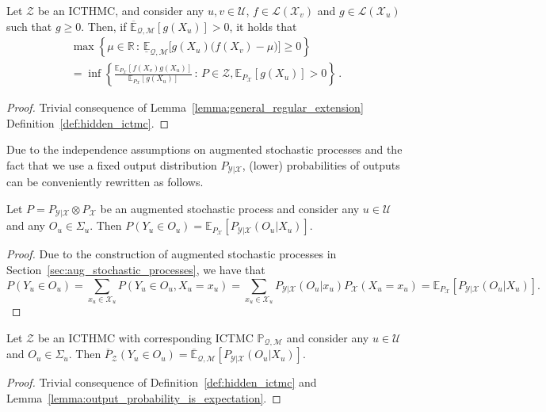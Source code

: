 \documentclass[twoside,11pt]{article}
\newcommand{\reals}{\mathbb{R}}
\newcommand{\states}{\mathcal{X}}
\newcommand{\observs}{\mathcal{Y}}
\newcommand{\lexp}{\underline{\mathbb{E}}_{\rateset,\mathcal{M}}}
\newcommand{\uexp}{\overline{\mathbb{E}}_{\rateset,\mathcal{M}}}
\newcommand{\gambles}{\mathcal{L}}
\newcommand{\rateset}{\mathcal{Q}}
\begin{document}
\begin{corollary}\label{cor:lower_hidden_is_root_chain}
Let $\mathcal{Z}$ be an ICTHMC, and consider any $u,v\in\mathcal{U}$, $f\in\gambles(\states_v)$ and $g\in\gambles(\states_u)$ such that $g\geq 0$. Then, if $\uexp[g(X_u)]>0$, it holds that
\begin{multline*}
\max\left\{\mu\in\reals\,:\, \lexp\bigl[g(X_u)\bigl(f(X_v) - \mu\bigr)\bigr] \geq 0\right\}\\ = \inf\left\{ \frac{\mathbb{E}_{P_\states}[f(X_v)g(X_u)]}{\mathbb{E}_{P_\states}[g(X_u)]}\,:\,P\in\mathcal{Z}, \mathbb{E}_{P_\states}[g(X_u)]>0 \right\}\,.
\end{multline*}
\end{corollary}
\begin{proof}
Trivial consequence of Lemma~\ref{lemma:general_regular_extension} %
Definition~\ref{def:hidden_ictmc}.
\end{proof}

Due to the independence assumptions on augmented stochastic processes and the fact that we use a fixed output distribution $P_{\observs\vert\states}$, (lower) probabilities of outputs can be conveniently rewritten as follows.
\begin{lemma}\label{lemma:output_probability_is_expectation}
Let $P=P_{\observs\vert\states}\otimes P_\states$ be an augmented stochastic process and consider any $u\in\mathcal{U}$ and any $O_u\in\Sigma_u$. Then $P(Y_u\in O_u)=\mathbb{E}_{P_\states}[P_{\observs\vert\states}(O_u\vert X_u)]$.
\end{lemma}
\begin{proof}
Due to the construction of augmented stochastic processes in Section~\ref{sec:aug_stochastic_processes}, we have that
\begin{equation*}
P(Y_u\in O_u) = \sum_{x_u\in\states_u} P(Y_u\in O_u, X_u=x_u) 
 = \sum_{x_u\in\states_u} P_{\observs\vert\states}(O_u\vert x_u)P_\states(X_u=x_u) 
 = \mathbb{E}_{P_\states}[P_{\observs\vert\states}(O_u\vert X_u)].
\end{equation*}
\end{proof}
\begin{lemma}\label{lemma:lower_output_probability_is_expectation}
Let $\mathcal{Z}$ be an ICTHMC with corresponding ICTMC $\mathbb{P}_{\rateset,\mathcal{M}}$ and consider any $u\in\mathcal{U}$ and $O_u\in\Sigma_u$. Then $\overline{P}_{\mathcal{Z}}(Y_u\in O_u)=\uexp[P_{\observs\vert\states}(O_u\vert X_u)]$.
\end{lemma}
\begin{proof}
Trivial consequence of Definition~\ref{def:hidden_ictmc} and Lemma~\ref{lemma:output_probability_is_expectation}.
\end{proof}
\end{document}
